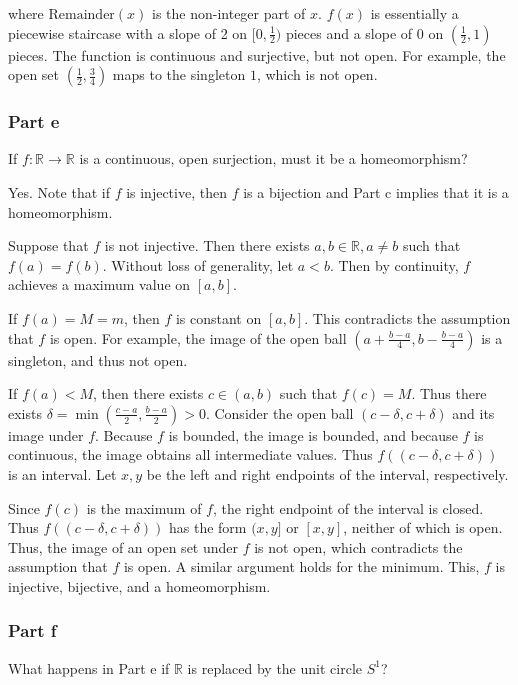 \documentclass{article}
\begin{document}
where $\text{Remainder}(x)$ is the non-integer part of $x$. $f(x)$ is essentially a piecewise staircase with a slope of 2 on $[0, \frac{1}{2})$ pieces and a slope of 0 on $(\frac{1}{2}, 1)$ pieces. The function is continuous and surjective, but not open. For example, the open set $(\frac{1}{2}, \frac{3}{4})$ maps to the singleton ${1}$, which is not open.

\subsubsection*{Part e}
If $f: \mathbb{R} \rightarrow \mathbb{R}$ is a continuous, open surjection, must it be a homeomorphism?

Yes. Note that if $f$ is injective, then $f$ is a bijection and Part c implies that it is a homeomorphism.

Suppose that $f$ is not injective. Then there exists $a, b \in \mathbb{R}, a \neq b$ such that $f(a) = f(b)$. Without loss of generality, let $a < b$. Then by continuity, $f$ achieves a maximum value on $[a, b]$.

If $f(a) = M = m$, then $f$ is constant on $[a, b]$. This contradicts the assumption that $f$ is open. For example, the image of the open ball $(a + \frac{b-a}{4}, b - \frac{b-a}{4})$ is a singleton, and thus not open.

If $f(a) < M$, then there exists $c \in (a, b)$ such that $f(c) = M$. Thus there exists $\delta = \min(\frac{c-a}{2}, \frac{b-a}{2})>0$. Consider the open ball $(c-\delta, c+\delta)$ and its image under $f$. Because $f$ is bounded, the image is bounded, and because $f$ is continuous, the image obtains all intermediate values. Thus $f((c-\delta, c+\delta))$ is an interval. Let $x, y$ be the left and right endpoints of the interval, respectively. 

Since $f(c)$ is the maximum of $f$, the right endpoint of the interval is closed. Thus $f((c-\delta, c+\delta))$ has the form $(x, y]$ or $[x, y]$, neither of which is open. Thus, the image of an open set under $f$ is not open, which contradicts the assumption that $f$ is open. A similar argument holds for the minimum. This, $f$ is injective, bijective, and a homeomorphism.

\subsubsection*{Part f}

What happens in Part e if $\mathbb{R}$ is replaced by the unit circle $S^1$?
\end{document}
